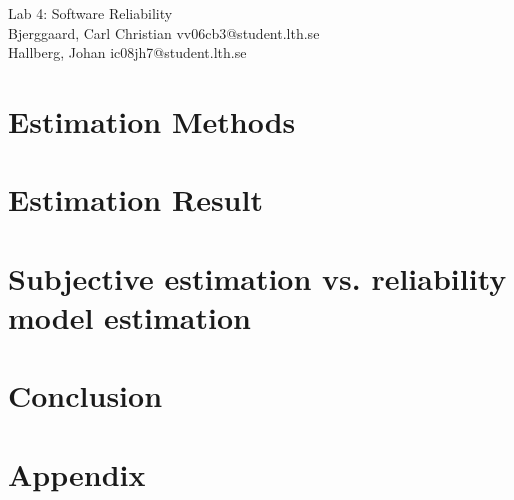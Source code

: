 \documentclass[titlepage]{article}
\begin{document}
\begin{center}
	\huge{Lab 4: Software Reliability } \\
	\small{Bjerggaard, Carl Christian vv06cb3@student.lth.se \\Hallberg, Johan ic08jh7@student.lth.se}

\vspace*{1cm}

\end{center}

\thispagestyle{empty}

\clearpage
\section{Estimation Methods}
\label{methods}


\section{Estimation Result}
\label{results}


\section{Subjective estimation vs. reliability model estimation}
\label{subvsmodel}


\section{Conclusion}
\label{conclusion}

\clearpage
\section*{Appendix}
\label{appendix}

\end{document}
